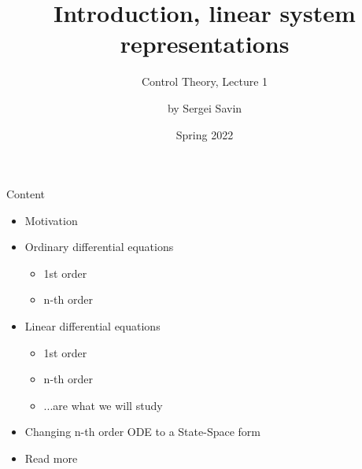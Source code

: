 \documentclass{beamer}
\title{Introduction, linear system representations}
\subtitle{Control Theory, Lecture 1}
\author{by Sergei Savin}
\date{Spring 2022}
\begin{document}
\maketitle


\begin{frame}{Content}

\begin{itemize}
\item Motivation
\item Ordinary differential equations
    \begin{itemize}
    \item 1st order
    \item n-th order
    \end{itemize}
\item Linear differential equations
    \begin{itemize}
    \item 1st order
    \item n-th order
    \item ...are what we will study
    \end{itemize}
\item Changing n-th order ODE to a State-Space form
\item Read more
\end{itemize}

\end{frame}
\end{document}
